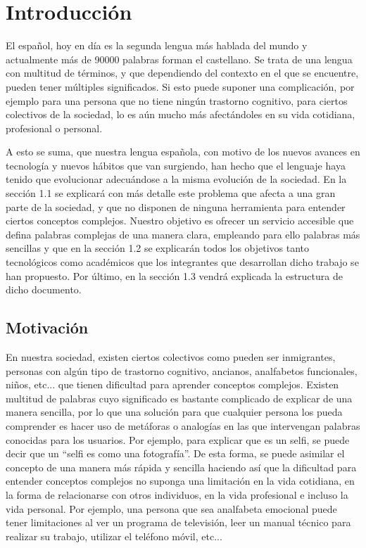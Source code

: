 \chapter{Introducción}
\label{cap:introduccion}


El español, hoy en día es la segunda lengua más hablada del mundo y actualmente más de 90000 palabras forman el castellano. 
Se trata de una lengua con multitud de términos, y que dependiendo del contexto en el que se encuentre, pueden tener múltiples significados.
Si esto puede suponer una complicación, por ejemplo para una persona que no tiene ningún trastorno cognitivo, para ciertos colectivos de la sociedad, lo es aún mucho más afectándoles en su vida cotidiana, profesional o personal. 

A esto se suma, que nuestra lengua española, con motivo de los nuevos avances en tecnología y nuevos hábitos que van surgiendo, han hecho que el lenguaje haya tenido que evolucionar adecuándose a la misma evolución de la sociedad.
En la sección 1.1 se explicará con más detalle este problema que afecta a una gran parte de la sociedad, y que no disponen de ninguna herramienta para entender ciertos conceptos complejos. 
Nuestro objetivo es ofrecer un servicio accesible que defina palabras complejas de una manera clara, empleando para ello palabras más sencillas y que en la sección 1.2 se explicarán todos los objetivos tanto tecnológicos como académicos que los integrantes que desarrollan dicho trabajo se han propuesto.
Por último, en la sección 1.3 vendrá explicada la estructura de dicho documento.



	


\section{Motivación}
\label{cap:sec:motivacion}

En nuestra sociedad, existen ciertos colectivos como pueden ser inmigrantes, personas con algún tipo de trastorno cognitivo, ancianos, analfabetos funcionales, niños, etc... que tienen dificultad para aprender conceptos complejos. 
Existen multitud de palabras cuyo significado es bastante complicado de explicar de una manera sencilla, por lo que una solución para que cualquier persona los pueda comprender es hacer uso de metáforas o analogías en las que intervengan palabras conocidas para los usuarios. Por ejemplo, para explicar que es un selfi, se puede decir que un ``selfi es como una fotografía''. De esta forma, se puede asimilar el concepto de una manera más rápida y sencilla haciendo así que la dificultad para entender conceptos complejos no suponga una limitación en la vida cotidiana, en la forma de relacionarse con otros individuos, en la vida profesional e incluso la vida personal. 
Por ejemplo, una persona que sea analfabeta emocional puede tener limitaciones al ver un programa de televisión, leer un manual técnico para realizar su trabajo, utilizar el teléfono móvil, etc...

